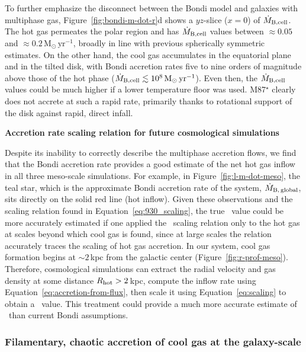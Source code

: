 To further emphasize the disconnect between the Bondi model and galaxies with multiphase gas, Figure~\ref{fig:bondi-m-dot-r}d shows a $yz$-slice ($x=0$) of $\dot{M}_{\rm B,cell}$.
The hot gas permeates the polar region and has $\dot{M}_{\rm B,cell}$ values between $\approx 0.05$ and $\approx 0.2 \,\mathrm{M_{\odot}\,yr^{-1}}$, broadly in line with previous spherically symmetric estimates.
On the other hand, the cool gas accumulates in the equatorial plane and in the tilted disk, with Bondi accretion rates five to nine orders of magnitude above those of the hot phase ($\dot{M}_{\rm B,cell}\lesssim 10^8\,\mathrm{M_{\odot}\,yr^{-1}}$).
Even then, the $\dot{M}_{\rm B,cell}$ values could be much higher if a lower temperature floor was used.
M87$^{\star}$ clearly does not accrete at such a rapid rate, primarily thanks to rotational support of the disk against rapid, direct infall.

\centerline{\textbf{Accretion rate scaling relation for future cosmological simulations}}

Despite its inability to correctly describe the multiphase accretion flows, we find that the Bondi accretion rate provides a good estimate of the net hot gas inflow in all three meso-scale simulations.
For example, in Figure~\ref{fig:l-m-dot-meso}, the teal star, which is the approximate Bondi accretion rate of the system, $\dot{M}_{\rm B,\,global}$, sits directly on the solid red line (hot inflow).
Given these observations and the scaling relation found in Equation~\ref{eq:930_scaling}, the true \mdotbh\ value could be more accurately estimated if one applied the \mrrelation\ scaling relation only to the hot gas at scales beyond which cool gas is found, since at large scales the relation accurately traces the scaling of hot gas accretion.
In our system, cool gas formation begins at $\sim 2$\,kpc from the galactic center (Figure~\ref{fig:r-prof-meso}).
Therefore, cosmological simulations can extract the radial velocity and gas density at some distance $R_{\rm hot} > 2$\,kpc, compute the inflow rate using Equation~\ref{eq:accretion-from-flux}, then scale it using Equation~\ref{eq:scaling} to obtain a \mdotbh\ value.
This treatment could provide a much more accurate estimate of \mdotbh\ than current Bondi assumptions.


\subsubsection{Filamentary, chaotic accretion of cool gas at the galaxy-scale}
\label{subsec:filaments}

